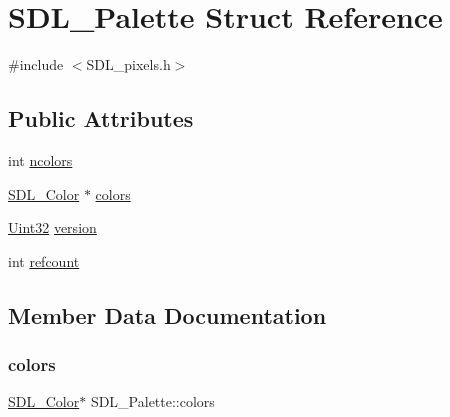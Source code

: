 \hypertarget{struct_s_d_l___palette}{}\section{S\+D\+L\+\_\+\+Palette Struct Reference}
\label{struct_s_d_l___palette}


{\ttfamily \#include $<$S\+D\+L\+\_\+pixels.\+h$>$}

\subsection*{Public Attributes}
\begin{DoxyCompactItemize}
\item 
int \hyperlink{struct_s_d_l___palette_a81a0cc3197480e994c6b06f1f0567091}{ncolors}
\item 
\hyperlink{struct_s_d_l___color}{S\+D\+L\+\_\+\+Color} $\ast$ \hyperlink{struct_s_d_l___palette_ad757a50037f43533196e94942440b241}{colors}
\item 
\hyperlink{_s_d_l__stdinc_8h_add440eff171ea5f55cb00c4a9ab8672d}{Uint32} \hyperlink{struct_s_d_l___palette_a5b8d45519f6850a32f13f1602ce37a8e}{version}
\item 
int \hyperlink{struct_s_d_l___palette_a35c667737f883f973bb0a8dea143b08d}{refcount}
\end{DoxyCompactItemize}


\subsection{Member Data Documentation}
\mbox{\label{struct_s_d_l___palette_ad757a50037f43533196e94942440b241}} 
\subsubsection{\texorpdfstring{colors}{colors}}
{\footnotesize\ttfamily \hyperlink{struct_s_d_l___color}{S\+D\+L\+\_\+\+Color}$\ast$ S\+D\+L\+\_\+\+Palette\+::colors}

\mbox{\label{struct_s_d_l___palette_a81a0cc3197480e994c6b06f1f0567091}} 
